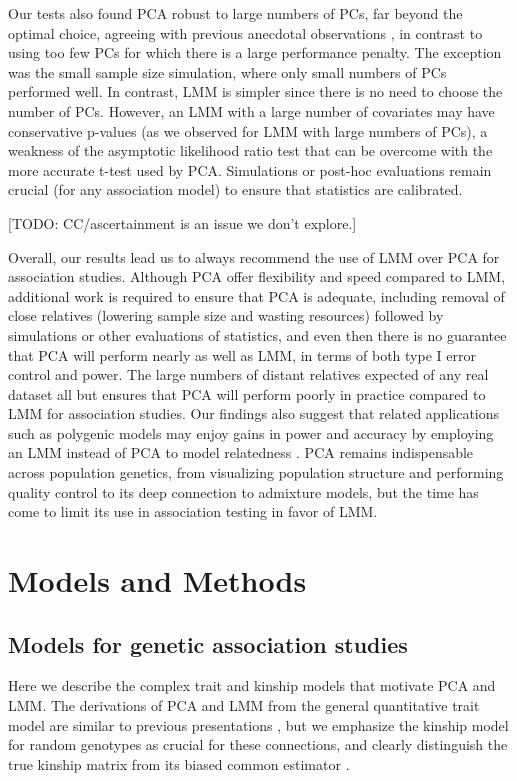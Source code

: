 \documentclass[11pt]{article}
\begin{document}
Our tests also found PCA robust to large numbers of PCs, far beyond the optimal choice, agreeing with previous anecdotal observations \citep{price_principal_2006, kang_variance_2010}, in contrast to using too few PCs for which there is a large performance penalty.
The exception was the small sample size simulation, where only small numbers of PCs performed well.
In contrast, LMM is simpler since there is no need to choose the number of PCs.
However, an LMM with a large number of covariates may have conservative p-values (as we observed for LMM with large numbers of PCs), a weakness of the asymptotic likelihood ratio test that can be overcome with the more accurate t-test used by PCA.
Simulations or post-hoc evaluations remain crucial (for any association model) to ensure that statistics are calibrated.

[TODO: CC/ascertainment is an issue we don't explore.]

Overall, our results lead us to always recommend the use of LMM over PCA for association studies.
Although PCA offer flexibility and speed compared to LMM, additional work is required to ensure that PCA is adequate, including removal of close relatives (lowering sample size and wasting resources) followed by simulations or other evaluations of statistics, and even then there is no guarantee that PCA will perform nearly as well as LMM, in terms of both type I error control and power.
The large numbers of distant relatives expected of any real dataset all but ensures that PCA will perform poorly in practice compared to LMM for association studies.
Our findings also suggest that related applications such as polygenic models may enjoy gains in power and accuracy by employing an LMM instead of PCA to model relatedness \citep{rakitsch_lasso_2013,qian_fast_2020}.
PCA remains indispensable across population genetics, from visualizing population structure and performing quality control to its deep connection to admixture models, but the time has come to limit its use in association testing in favor of LMM.

\section{Models and Methods}

\subsection{Models for genetic association studies}

Here we describe the complex trait and kinship models that motivate PCA and LMM.
The derivations of PCA and LMM from the general quantitative trait model are similar to previous presentations \citep{astle_population_2009, hoffman_correcting_2013}, but we emphasize the kinship model for random genotypes as crucial for these connections, and clearly distinguish the true kinship matrix from its biased common estimator \citep{ochoa_estimating_2021, ochoa_human}.
\end{document}
